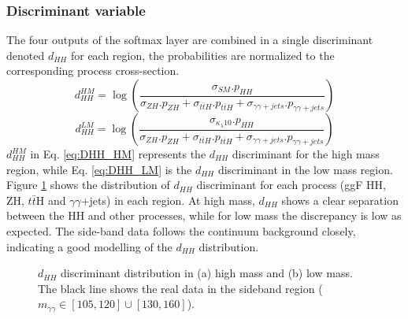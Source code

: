 \subsubsection{Discriminant variable}
The four outputs of the softmax layer are combined in a single discriminant denoted $d_{HH}$ for each region, the probabilities are normalized to the corresponding process cross-section.
\begin{equation}
    d_{HH}^{HM} = \log \left(\frac{\sigma_{SM}.p_{HH}}{\sigma_{ZH}.p_{ZH}+\sigma_{t\bar{t}H}.p_{t\bar{t}H}+\sigma_{\gamma\gamma+jets}.p_{\gamma\gamma+jets}}\right)
    \label{eq:DHH_HM}
\end{equation}
\begin{equation}
    d_{HH}^{LM} = \log \left(\frac{\sigma_{\kappa_\lambda10}.p_{HH}}{\sigma_{ZH}.p_{ZH}+\sigma_{t\bar{t}H}.p_{t\bar{t}H}+\sigma_{\gamma\gamma+jets}.p_{\gamma\gamma+jets}}\right)
    \label{eq:DHH_LM}
\end{equation}
$d_{HH}^{HM}$ in Eq. \ref{eq:DHH_HM} represents the $d_{HH}$ discriminant for the high mass region, while Eq. \ref{eq:DHH_LM} is the $d_{HH}$ discriminant in the low mass region. \\
Figure \ref{fig:HHyybb:ObjEvt:DNN:dHH} shows the distribution of $d_{HH}$ discriminant for each process (ggF HH, ZH, $t\bar{t}$H and $\gamma\gamma$+jets) in each region. At high mass, $d_{HH}$ shows a clear separation between the HH and other processes, while for low mass the discrepancy is low as expected. The side-band data follows the continuum background closely, indicating a good modelling of the $d_{HH}$ distribution. 
\begin{figure}[htbp]
    \centering
    \begin{tcolorbox}[colback=black!5!white,colframe=white!75!black]
    \caption{$d_{HH}$ discriminant distribution in (a) high mass and (b) low mass. The black line shows the real data in the sideband region ($m_{\gamma\gamma}\in[105,120] \cup [130,160]$).}
    \label{fig:HHyybb:ObjEvt:DNN:dHH}
    \end{tcolorbox}
    
\end{figure}

